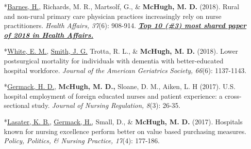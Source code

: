 \documentclass[10pt,]{article}
\begin{document}
{{{{{{{{{{{{{{{\begin{hangparas}{.25in}{1}
\end{hangparas}

\vspace{4mm}

\begin{hangparas}{.25in}{1}

*{\underline {Barnes, H.}}, Richards, M. R., Martsolf, G., \& {\textbf {McHugh, M. D.}} (2018). Rural and non-rural primary care physician practices increasingly rely on nurse practitioners. {\textit {Health Affairs, 37}}(6): 908-914. {\textit {\textbf {\underline {Top 10 (\#3) most shared paper of 2018 in Health Affairs.}}}}

\end{hangparas}

\vspace{4mm}

\begin{hangparas}{.25in}{1}

*{\underline {White, E. M.}}, {\underline {Smith, J. G.}} Trotta, R. L., \& {\textbf {McHugh, M. D.}} (2018). Lower postsurgical mortality for individuals with dementia with better-educated hospital workforce. {\textit {Journal of the American Geriatrics Society, 66}}(6): 1137-1143.

\end{hangparas}

\vspace{4mm}

\begin{hangparas}{.25in}{1}

*{\underline {Germack, H. D.}}, {\textbf {McHugh, M. D.,}} Sloane, D. M., Aiken, L. H (2017). U.S. hospital employment of foreign educated nurses and patient experience: a cross-sectional study. {\textit {Journal of Nursing Regulation, 8}}(3): 26-35.

\end{hangparas}

\vspace{4mm}

\begin{hangparas}{.25in}{1}

*{\underline {Lasater, K. B.}}, {\underline {Germack, H.,}} Small, D., \& {\textbf {McHugh, M. D.}} (2017). Hospitals known for nursing excellence perform better on value based purchasing measures. {\textit {Policy, Politics, \& Nursing Practice, 17}}(4): 177-186.

\end{hangparas}

\vspace{4mm}

}}}}}}}}}}}}}}}
\end{document}
